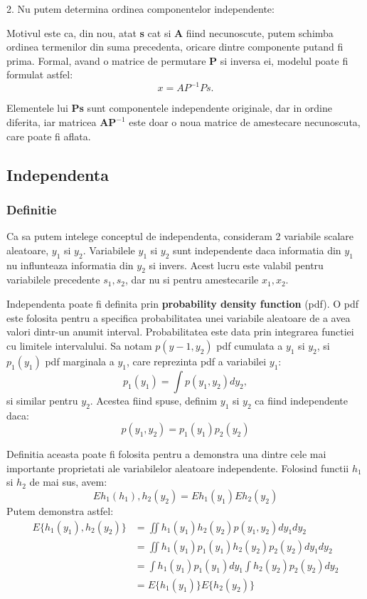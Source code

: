 \documentclass[12pt,oneside]{article}
\begin{document}
2. Nu putem determina ordinea componentelor independente:

Motivul este ca, din nou, atat \textbf{s} cat si \textbf{A} fiind necunoscute, putem schimba ordinea termenilor din suma precedenta, oricare dintre componente putand fi prima. Formal, avand o matrice de permutare \textbf{P} si inversa ei, modelul poate fi formulat astfel:
\begin{equation}
	x=AP^{-1}Ps.
\end{equation}

Elementele lui \textbf{Ps} sunt componentele independente originale, dar in ordine diferita, iar matricea $\textbf{AP}^{-1}$ este doar o noua matrice de amestecare necunoscuta, care poate fi aflata.
\newpage

\subsection{Independenta}
\subsubsection{Definitie} 

Ca sa putem intelege conceptul de independenta, consideram 2 variabile scalare aleatoare, $y_1$ si $y_2$. Variabilele $y_1$ si $y_2$ sunt independente daca informatia din $y_1$ nu influnteaza informatia din $y_2$ si invers. Acest lucru este valabil pentru variabilele precedente $s_1,s_2$, dar nu si pentru amestecarile $x_1,x_2$.

Independenta poate fi definita prin \textbf{probability density function} (pdf). O pdf este folosita pentru a specifica probabilitatea unei variabile aleatoare de a avea valori dintr-un anumit interval. Probabilitatea este data prin integrarea functiei cu limitele intervalului. Sa notam $p(y-1,y_2)$ pdf cumulata a $y_1$ si $y_2$, si $p_1(y_1)$ pdf marginala a $y_1$, care reprezinta pdf a variabilei $y_1$:
\begin{equation}
p_1(y_1)=\int{p(y_1,y_2)dy_2},
\end{equation}
si similar pentru $y_2$. Acestea fiind spuse, definim $y_1$ si $y_2$ ca fiind independente daca:
\begin{equation}
	p(y_1,y_2)=p_1(y_1)p_2(y_2)
\end{equation}

Definitia aceasta poate fi folosita pentru a demonstra una dintre cele mai importante proprietati ale variabilelor aleatoare independente. Folosind functii $h_1$ si $h_2$ de mai sus, avem:
\begin{equation}
E{h_1(h_1),h_2(y_2)}=E{h_1(y_1)}E{h_2(y_2)}
\end{equation}
Putem demonstra astfel:
\begin{equation}
\begin{split}
E\{h_1(y_1),h_2(y_2)\} & =\iint{h_1(y_1)h_2(y_2)p(y_1,y_2)dy_1dy_2} \\ 
& =\iint{h_1(y_1)p_1(y_1)h_2(y_2)p_2(y_2)dy_1dy_2} \\
& =\int{h_1(y_1)p_1(y_1)dy_1}\int{h_2(y_2)p_2(y_2)dy_2}\\ 
& =E\{h_1(y_1)\}E\{h_2(y_2)\}
\end{split}
\end{equation}
\end{document}
